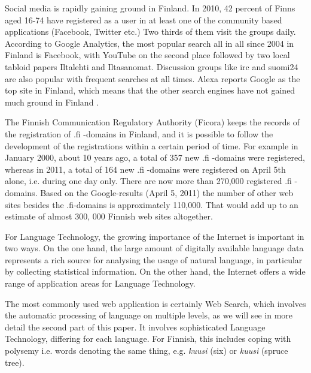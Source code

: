 \documentclass[]{../../metanetpaper}
\begin{document}
\begin{Parallel}[c]{77mm}{77mm}
{Social media is rapidly gaining ground in Finland. In 2010, 42 percent
of Finns aged 16-74 have registered as a user in at least one of the
community based applications (Facebook, Twitter etc.) Two thirds of
them visit the groups daily. According to Google Analytics, the most
popular search all in all since 2004 in Finland is Facebook, with
YouTube on the second place followed by two local tabloid papers
Iltalehti and Iltasanomat. Discussion groups like irc and suomi24 are
also popular with frequent searches at all times. Alexa reports Google
as the top site in Finland, which means that the other search engines
have not gained much ground in Finland \cite{topsites}.

The Finnish Communication Regulatory Authority (Ficora) keeps the
records of the registration of .fi -domains in Finland, and it is
possible to follow the development of the registrations within a
certain period of time. For example in January 2000, about 10 years
ago, a total of 357 new .fi -domains were registered, whereas in 2011,
a total of 164 new .fi -domains were registered on April 5th alone,
i.e. during one day only. There are now more than 270,000 registered
.fi -domains. Based on the Google-results (April 5, 2011) the number
of other web sites besides the .fi-domains is approximately
110,000. That would add up to an estimate of almost 300, 000 Finnish
web sites altogether.

For Language Technology, the growing importance of the Internet is
important in two ways. On the one hand, the large amount of digitally
available language data represents a rich source for analysing the
usage of natural language, in particular by collecting statistical
information. On the other hand, the Internet offers a wide range of
application areas for Language Technology.

The most commonly used web application is certainly Web Search, which
involves the automatic processing of language on multiple levels, as
we will see in more detail the second part of this paper. It involves
sophisticated Language Technology, differing for each language. For
Finnish, this includes coping with polysemy
i.e. words denoting the same thing, e.g.
\textit{\foreignlanguage{finnish}{\textit{kuusi}}} (six) or
\textit{\foreignlanguage{finnish}{\textit{kuusi}}} (spruce tree).

}
\end{Parallel}
\end{document}
